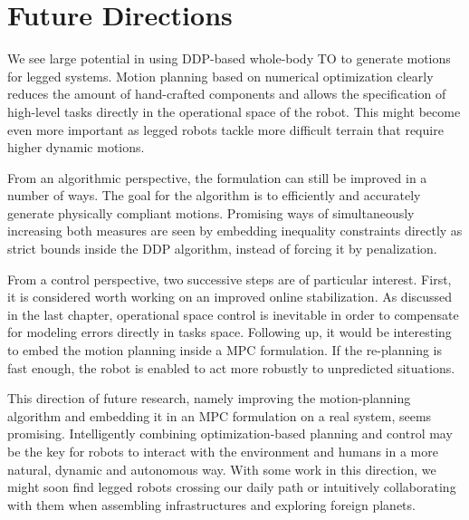 \section{Future Directions}
We see large potential in using \gls{DDP}-based whole-body \gls{TO} to generate motions for legged systems. Motion planning based on numerical optimization clearly reduces the amount of hand-crafted components and allows the specification of high-level tasks directly in the operational space of the robot. This might become even more important as legged robots tackle more difficult terrain that require higher dynamic motions.
  
From an algorithmic perspective, the formulation can still be improved in a number of ways. The goal for the algorithm is to efficiently and accurately generate physically compliant motions. Promising ways of simultaneously increasing both measures are seen by embedding inequality constraints directly as strict bounds inside the \gls{DDP} algorithm, instead of forcing it by penalization.

From a control perspective, two successive steps are of particular interest. First, it is considered worth working on an improved online stabilization. As discussed in the last chapter, operational space control is inevitable in order to compensate for modeling errors directly in tasks space. Following up, it would be interesting to embed the motion planning inside a \gls{MPC} formulation. If the re-planning is fast enough, the robot is enabled to act more robustly to unpredicted situations. 

This direction of future research, namely improving the motion-planning algorithm and embedding it in an \gls{MPC} formulation on a real system, seems promising. Intelligently combining optimization-based planning and control may be the key for robots to interact with the environment and humans in a more natural, dynamic and autonomous way. With some work in this direction, we might soon find legged robots crossing our daily path or intuitively collaborating with them when assembling infrastructures and exploring foreign planets. 